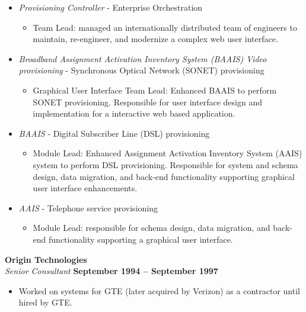 \documentclass[margin,line]{resume}
\begin{document}
\begin{resume}
\begin{itemize}
\begin{itemize}
\begin{itemize}
      \end{itemize}
      \item \textsl{Provisioning Controller} - Enterprise Orchestration
      \begin{itemize}
          \item Team Lead: managed an internationally distributed team of engineers to maintain, re-engineer, and modernize a complex web user interface.
      \end{itemize}
      \item \textsl{Broadband Assignment Activation Inventory System (BAAIS) Video provisioning} - Synchronous Optical Network (SONET) provisioning
      \begin{itemize}
          \item Graphical User Interface Team Lead: Enhanced BAAIS to perform SONET provisioning. Responsible for user interface design and implementation for a interactive web based application.
      \end{itemize}
      \item \textsl{BAAIS} - Digital Subscriber Line (DSL) provisioning
      \begin{itemize}
          \item Module Lead: Enhanced Assignment Activation Inventory System (AAIS) system to perform DSL provisioning. Responsible for system and schema design, data migration, and back-end functionality supporting graphical user interface enhancements.
      \end{itemize}
      \item \textsl{AAIS} - Telephone service provisioning
      \begin{itemize}
          \item Module Lead: responsible for schema design, data migration, and back-end functionality supporting a graphical user interface.
      \end{itemize}
      \end{itemize}
    \end{itemize}

    \textbf{\listing Origin Technologies} \vspace{2mm}\\\vspace{1mm}%
    \textsl{Senior Consultant} \hfill \textbf{September 1994 -- September 1997}\
    \begin{itemize}
        \item Worked on systems for GTE (later acquired by Verizon) as a contractor until hired by GTE.
    \end{itemize}
    


\end{resume}
\end{document}

